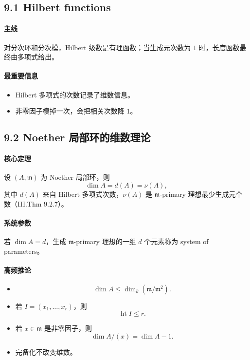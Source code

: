 \documentclass[a4paper]{ctexart}
\begin{document}
\subsection{9.1 Hilbert functions}

\paragraph{主线}
对分次环和分次模，Hilbert 级数是有理函数；当生成元次数为 \(1\) 时，长度函数最终由多项式给出。

\paragraph{最重要信息}
\begin{itemize}
  \item Hilbert 多项式的次数记录了维数信息。
  \item 非零因子模掉一次，会把相关次数降 \(1\)。
\end{itemize}

\subsection{9.2 Noether 局部环的维数理论}

\paragraph{核心定理}
设 \((A,\mathfrak m)\) 为 Noether 局部环，则
\[
\dim A=d(A)=\nu(A),
\]
其中 \(d(A)\) 来自 Hilbert 多项式次数，\(\nu(A)\) 是 \(\mathfrak m\)-primary 理想最少生成元个数（III.Thm 9.2.7）。

\paragraph{系统参数}
若 \(\dim A=d\)，生成 \(\mathfrak m\)-primary 理想的一组 \(d\) 个元素称为 system of parameters。

\paragraph{高频推论}
\begin{itemize}
  \item
  \[
    \dim A\le \dim_k(\mathfrak m/\mathfrak m^2).
  \]
  \item 若 \(I=(x_1,\dots,x_r)\)，则
  \[
    \operatorname{ht}I\le r.
  \]
  \item 若 \(x\in \mathfrak m\) 是非零因子，则
  \[
    \dim A/(x)=\dim A-1.
  \]
  \item 完备化不改变维数。
\end{itemize}
\end{document}
